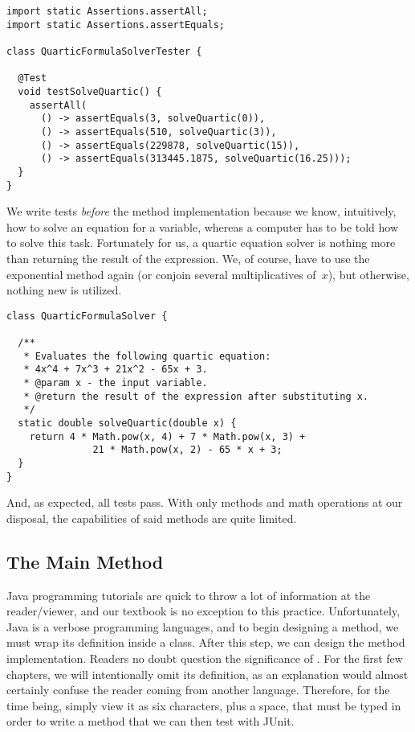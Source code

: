 \begin{lstlisting}[language=MyJava]
import static Assertions.assertAll;
import static Assertions.assertEquals;

class QuarticFormulaSolverTester {

  @Test
  void testSolveQuartic() {
    assertAll(
      () -> assertEquals(3, solveQuartic(0)),
      () -> assertEquals(510, solveQuartic(3)),
      () -> assertEquals(229878, solveQuartic(15)),
      () -> assertEquals(313445.1875, solveQuartic(16.25)));
  }
}
\end{lstlisting}

We write tests \emph{before} the method implementation because we know, intuitively, how to solve an equation for a variable, whereas a computer has to be told how to solve this task. 
Fortunately for us, a quartic equation solver is nothing more than returning the result of the expression. 
We, of course, have to use the exponential  method again (or conjoin several multiplicatives of~$x$), but otherwise, nothing new is utilized.

\begin{lstlisting}[language=MyJava]
class QuarticFormulaSolver {

  /**
   * Evaluates the following quartic equation:
   * 4x^4 + 7x^3 + 21x^2 - 65x + 3.
   * @param x - the input variable.
   * @return the result of the expression after substituting x.
   */
  static double solveQuartic(double x) {
    return 4 * Math.pow(x, 4) + 7 * Math.pow(x, 3) + 
               21 * Math.pow(x, 2) - 65 * x + 3;
  }
}
\end{lstlisting}

And, as expected, all tests pass. 
With only methods and math operations at our disposal, the capabilities of said methods are quite limited. 

\subsection{The Main Method}
Java programming tutorials are quick to throw a lot of information at the reader/viewer, and our textbook is no exception to this practice. 
Unfortunately, Java is a verbose programming languages, and to begin designing a method, we must wrap its definition inside a class. 
After this step, we can design the  method implementation. 
Readers no doubt question the significance of . 
For the first few chapters, we will intentionally omit its definition, as an explanation would almost certainly confuse the reader coming from another language. 
Therefore, for the time being, simply view it as six characters, plus a space, that must be typed in order to write a method that we can then test with JUnit. 


